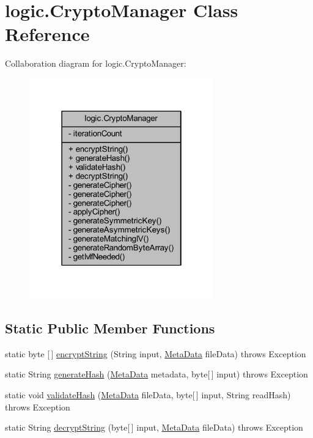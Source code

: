 \hypertarget{classlogic_1_1_crypto_manager}{}\section{logic.\+Crypto\+Manager Class Reference}
\label{classlogic_1_1_crypto_manager}


Collaboration diagram for logic.\+Crypto\+Manager\+:\nopagebreak
\begin{figure}[H]
\begin{center}
\leavevmode
\includegraphics[width=226pt]{classlogic_1_1_crypto_manager__coll__graph}
\end{center}
\end{figure}
\subsection*{Static Public Member Functions}
\begin{DoxyCompactItemize}
\item 
static byte \mbox{[}$\,$\mbox{]} \mbox{\hyperlink{classlogic_1_1_crypto_manager_a36145e4757e6a380388baddf5e36e984}{encrypt\+String}} (String input, \mbox{\hyperlink{classpersistence_1_1_meta_data}{Meta\+Data}} file\+Data)  throws Exception 	
\item 
static String \mbox{\hyperlink{classlogic_1_1_crypto_manager_a103625add9feb832706c59b3f7708d80}{generate\+Hash}} (\mbox{\hyperlink{classpersistence_1_1_meta_data}{Meta\+Data}} metadata, byte\mbox{[}$\,$\mbox{]} input)  throws Exception 	
\item 
static void \mbox{\hyperlink{classlogic_1_1_crypto_manager_acf7654dc6d2cdab1b9161f428145a6b8}{validate\+Hash}} (\mbox{\hyperlink{classpersistence_1_1_meta_data}{Meta\+Data}} file\+Data, byte\mbox{[}$\,$\mbox{]} input, String read\+Hash)  throws Exception 	
\item 
static String \mbox{\hyperlink{classlogic_1_1_crypto_manager_a50efd094cbcfb11a49a74007ddb05155}{decrypt\+String}} (byte\mbox{[}$\,$\mbox{]} input, \mbox{\hyperlink{classpersistence_1_1_meta_data}{Meta\+Data}} file\+Data)  throws Exception 	
\end{DoxyCompactItemize}
